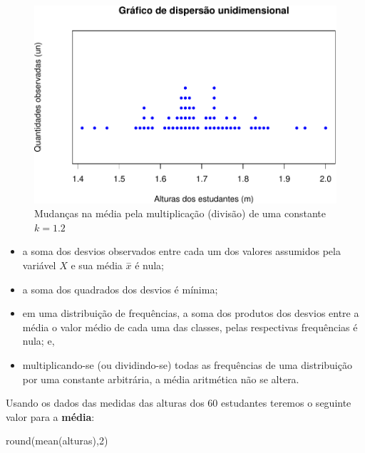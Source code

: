 \documentclass[
]{book}
\newenvironment{Shaded}{\begin{snugshade}}{\end{snugshade}}
\newcommand{\DecValTok}[1]{\textcolor[rgb]{0.00,0.00,0.81}{#1}}
\newcommand{\FunctionTok}[1]{\textcolor[rgb]{0.00,0.00,0.00}{#1}}
\newcommand{\NormalTok}[1]{#1}
\providecommand{\tightlist}{%
  \setlength{\itemsep}{0pt}\setlength{\parskip}{0pt}}
\begin{document}
\begin{figure}

{\centering \includegraphics{apostila_files/figure-latex/unnamed-chunk-20-1} 

}

\caption{Mudanças na média pela multiplicação (divisão) de uma constante $k=1.2$}\label{fig:unnamed-chunk-20}
\end{figure}

\hfill\break

\begin{itemize}
\tightlist
\item
  a soma dos desvios observados entre cada um dos valores assumidos pela variável \(X\) e sua média \(\stackrel{-}{x}\) é nula;
\item
  a soma dos quadrados dos desvios é mínima;
\item
  em uma distribuição de frequências, a soma dos produtos dos desvios entre a média o valor médio de cada uma das classes, pelas respectivas frequências é nula; e,
\item
  multiplicando-se (ou dividindo-se) todas as frequências de uma distribuição por uma constante arbitrária, a média aritmética não se altera.
\end{itemize}

\hfill\break

Usando os dados das medidas das alturas dos 60 estudantes teremos o seguinte valor para a \textbf{média}:

\hfill\break

\begin{Shaded}
\begin{Highlighting}[]
\FunctionTok{round}\NormalTok{(}\FunctionTok{mean}\NormalTok{(alturas),}\DecValTok{2}\NormalTok{)}
\end{Highlighting}
\end{Shaded}
\end{document}
